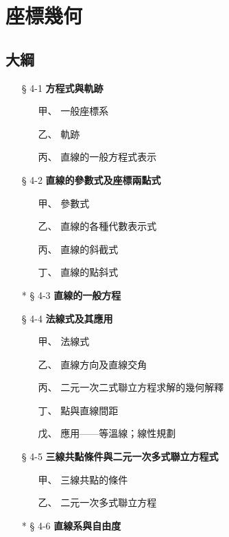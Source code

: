 \section{座標幾何}
\label{sec:b3s_ch4}

\subsection*{大綱}

\begin{itemize}[leftmargin=2em]
  \item[§ 4-1] \textbf{方程式與軌跡}
  \begin{itemize}[leftmargin=2em]
    \item[甲、] 一般座標系
    \item[乙、] 軌跡
    \item[丙、] 直線的一般方程式表示
  \end{itemize}
  \item[§ 4-2] \textbf{直線的參數式及座標兩點式}
  \begin{itemize}[leftmargin=2em]
    \item[甲、] 參數式
    \item[乙、] 直線的各種代數表示式
    \item[丙、] 直線的斜截式
    \item[丁、] 直線的點斜式
  \end{itemize}
  \item[* § 4-3] \textbf{直線的一般方程}
  \item[§ 4-4] \textbf{法線式及其應用}
  \begin{itemize}[leftmargin=2em]
    \item[甲、] 法線式
    \item[乙、] 直線方向及直線交角
    \item[丙、] 二元一次二式聯立方程求解的幾何解釋
    \item[丁、] 點與直線間距
    \item[戊、] 應用——等溫線；線性規劃
  \end{itemize}
  \item[§ 4-5] \textbf{三線共點條件與二元一次多式聯立方程式}
  \begin{itemize}[leftmargin=2em]
    \item[甲、] 三線共點的條件
    \item[乙、] 二元一次多式聯立方程
  \end{itemize}
  \item[* § 4-6] \textbf{直線系與自由度}
  \begin{itemize}[leftmargin=2em]

\end{itemize}
\end{itemize}
